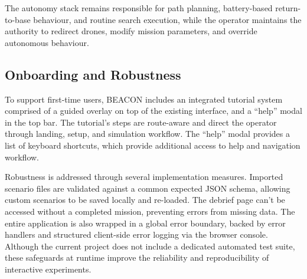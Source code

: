 The autonomy stack remains responsible for path planning, battery-based return-to-base behaviour, and routine search execution, while the operator maintains the authority to redirect drones, modify mission parameters, and override autonomous behaviour.

\subsection{Onboarding and Robustness}\label{subsec:onboarding-and-robustness}

To support first-time users, BEACON includes an integrated tutorial system comprised of a guided overlay on top of the existing interface, and a ``help'' modal in the top bar.
The tutorial's steps are route-aware and direct the operator through landing, setup, and simulation workflow.
The ``help'' modal provides a list of keyboard shortcuts, which provide additional access to help and navigation workflow.

Robustness is addressed through several implementation measures.
Imported scenario files are validated against a common expected JSON schema, allowing custom scenarios to be saved locally and re-loaded.
The debrief page can't be accessed without a completed mission, preventing errors from missing data.
The entire application is also wrapped in a global error boundary, backed by error handlers and structured client-side error logging via the browser console.
Although the current project does not include a dedicated automated test suite, these safeguards at runtime improve the reliability and reproducibility of interactive experiments.
